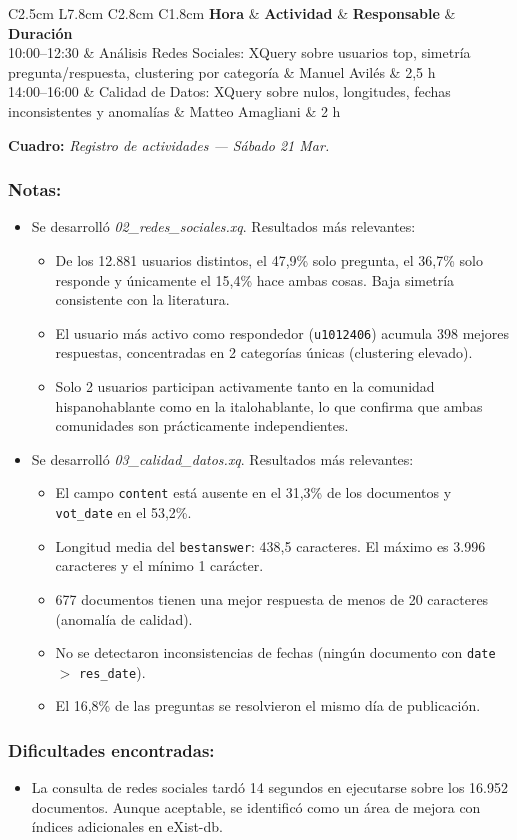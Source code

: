 \documentclass[11pt,a4paper]{article}
\newcommand{\notetitle}[1]{\subsubsection*{#1}}
\newcommand{\activitytable}[2]{%
  \begin{center}
  \begin{tabular}{C{2.5cm} L{7.8cm} C{2.8cm} C{1.8cm}}
  \toprule
  \rowcolor{white}
  \textbf{Hora} & \textbf{Actividad} & \textbf{Responsable} & \textbf{Duración} \\
  \midrule
  #1
  \bottomrule
  \end{tabular}
  \end{center}
  \vspace{-4pt}
  {\small\textbf{Cuadro:} \textit{#2}}
  \vspace{6pt}
}
\begin{document}
\activitytable{%
  10:00--12:30 & Análisis Redes Sociales: XQuery sobre usuarios top, simetría pregunta/respuesta, clustering por categoría & Manuel Avilés & 2,5 h \\
  \rowcolor{tablegray}
  14:00--16:00 & Calidad de Datos: XQuery sobre nulos, longitudes, fechas inconsistentes y anomalías & Matteo Amagliani & 2 h \\
}{Registro de actividades --- Sábado 21 Mar.}

\notetitle{Notas:}
\begin{itemize}
  \item Se desarrolló \textit{02\_redes\_sociales.xq}. Resultados más relevantes:
  \begin{itemize}
    \item De los 12.881 usuarios distintos, el 47,9\% solo pregunta, el 36,7\% solo responde y únicamente el 15,4\% hace ambas cosas. Baja simetría consistente con la literatura.
    \item El usuario más activo como respondedor (\texttt{u1012406}) acumula 398 mejores respuestas, concentradas en 2 categorías únicas (clustering elevado).
    \item Solo 2 usuarios participan activamente tanto en la comunidad hispanohablante como en la italohablante, lo que confirma que ambas comunidades son prácticamente independientes.
  \end{itemize}
  \item Se desarrolló \textit{03\_calidad\_datos.xq}. Resultados más relevantes:
  \begin{itemize}
    \item El campo \texttt{content} está ausente en el 31,3\% de los documentos y \texttt{vot\_date} en el 53,2\%.
    \item Longitud media del \texttt{bestanswer}: 438,5 caracteres. El máximo es 3.996 caracteres y el mínimo 1 carácter.
    \item 677 documentos tienen una mejor respuesta de menos de 20 caracteres (anomalía de calidad).
    \item No se detectaron inconsistencias de fechas (ningún documento con \texttt{date} $>$ \texttt{res\_date}).
    \item El 16,8\% de las preguntas se resolvieron el mismo día de publicación.
  \end{itemize}
\end{itemize}

\notetitle{Dificultades encontradas:}
\begin{itemize}
  \item La consulta de redes sociales tardó 14 segundos en ejecutarse sobre los 16.952 documentos. Aunque aceptable, se identificó como un área de mejora con índices adicionales en eXist-db.
\end{itemize}
\end{document}
